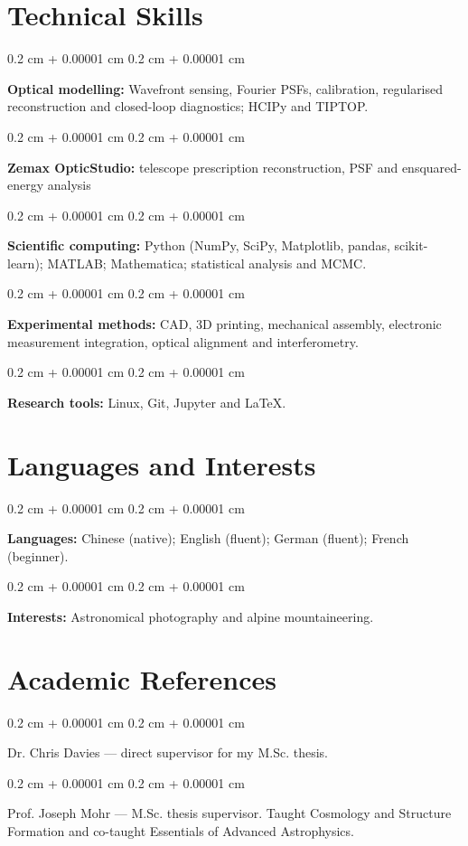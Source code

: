 \documentclass[10pt, a4paper]{article}
\newenvironment{onecolentry}{
    \begin{adjustwidth}{
        0.2 cm + 0.00001 cm
    }{
        0.2 cm + 0.00001 cm
    }
}{
    \end{adjustwidth}
} %
\begin{document}
\section{Technical Skills}
\begin{onecolentry}
\textbf{Optical modelling:} Wavefront sensing, Fourier PSFs, calibration, regularised reconstruction and closed-loop diagnostics; HCIPy and TIPTOP.
\end{onecolentry}
\vspace{0.04 cm}
\begin{onecolentry}
\textbf{Zemax OpticStudio:} telescope prescription reconstruction, PSF and ensquared-energy analysis
\end{onecolentry}
\vspace{0.04 cm}
\begin{onecolentry}
\textbf{Scientific computing:} Python (NumPy, SciPy, Matplotlib, pandas, scikit-learn); MATLAB; Mathematica; statistical analysis and MCMC.
\end{onecolentry}
\vspace{0.04 cm}
\begin{onecolentry}
\textbf{Experimental methods:} CAD, 3D printing, mechanical assembly, electronic measurement integration, optical alignment and interferometry.
\end{onecolentry}
\vspace{0.04 cm}
\begin{onecolentry}
\textbf{Research tools:} Linux, Git, Jupyter and LaTeX.
\end{onecolentry}
\vspace{0.04 cm}
\section{Languages and Interests}
\begin{onecolentry}
\textbf{Languages:} Chinese (native); English (fluent); German (fluent); French (beginner).
\end{onecolentry}
\begin{onecolentry}
\textbf{Interests:} Astronomical photography and alpine mountaineering.
\end{onecolentry}
\section{Academic References}
\begin{onecolentry}
Dr. Chris Davies — direct supervisor for my M.Sc. thesis.
\end{onecolentry}
\begin{onecolentry}
Prof. Joseph Mohr — M.Sc. thesis supervisor. Taught Cosmology and Structure Formation and co-taught Essentials of Advanced Astrophysics.
\end{onecolentry}
\end{document}
